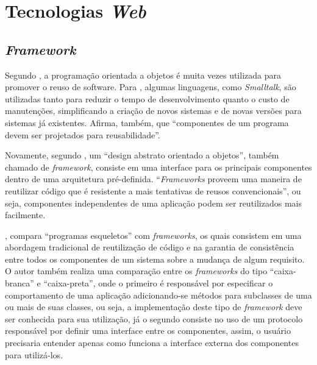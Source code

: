 \chapter{Tecnologias \textit{Web}}

\section{\textit{Framework}}
Segundo , a programação orientada a objetos é muita vezes utilizada para promover o reuso de software. Para , algumas linguagens, como \textit{Smalltalk}, são utilizadas tanto para reduzir o tempo de desenvolvimento quanto o custo de manutenções, simplificando a criação de novos sistemas e de novas versões para sistemas já existentes. Afirma, também, que “componentes de um programa devem ser projetados para reusabilidade”.

Novamente, segundo , um “design abstrato orientado a objetos”, também chamado de \textit{framework}, consiste em uma interface para os principais componentes dentro de uma
arquitetura pré-definida. “\textit{Frameworks} proveem uma maneira de reutilizar código que é resistente a mais tentativas de reusos convencionais”, ou seja, componentes independentes de uma aplicação podem ser reutilizados mais facilmente.

, compara “programas esqueletos” com \textit{frameworks}, os quais consistem em uma abordagem tradicional de reutilização de código e na garantia de consistência entre todos os componentes de um sistema sobre a mudança de algum requisito. O autor também realiza uma comparação entre os \textit{frameworks} do tipo “caixa-branca” e “caixa-preta”, onde o primeiro é responsável por especificar o comportamento de uma aplicação adicionando-se métodos para subclasses de uma ou mais de suas classes, ou seja, a implementação deste tipo de \textit{framework} deve ser conhecida para sua utilização, já o segundo consiste no uso de um protocolo responsável por definir uma interface entre os componentes, assim, o usuário precisaria entender apenas como funciona a interface externa dos componentes para utilizá-los.

